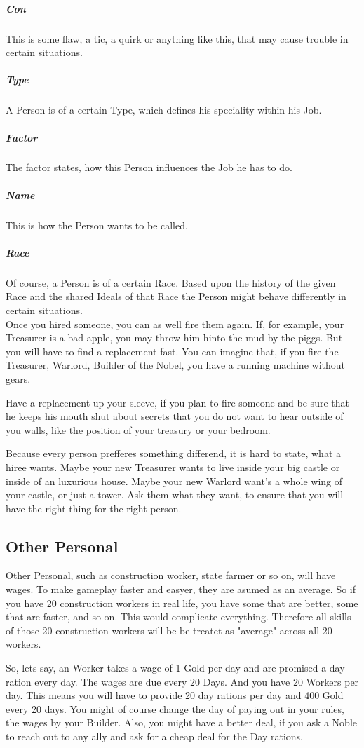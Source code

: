 \documentclass[10pt,twoside,twocolumn,openany]{book}
\begin{document}
\subparagraph{Con} This is some flaw, a tic, a quirk or anything like this, that may cause trouble in certain situations.

\subparagraph{Type} A Person is of a certain Type, which defines his speciality within his Job.

\subparagraph{Factor} The factor states, how this Person influences the Job he has to do.

\subparagraph{Name} This is how the Person wants to be called.

\subparagraph{Race} Of course, a Person is of a certain Race. Based upon the history of the given Race and the shared Ideals of that Race the Person might behave differently in certain situations.\\

Once you hired someone, you can as well fire them again. If, for example, your Treasurer is a bad apple, you may throw him hinto the mud by the piggs. But you will have to find a replacement fast. You can imagine that, if you fire the Treasurer, Warlord, Builder of the Nobel, you have a running machine without gears.

Have a replacement up your sleeve, if you plan to fire someone and be sure that he keeps his mouth shut about secrets that you do not want to hear outside of you walls, like the position of your treasury or your bedroom.

Because every person prefferes something differend, it is hard to state, what a hiree wants. Maybe your new Treasurer wants to live inside your big castle or inside of an luxurious house. Maybe your new Warlord want's a whole wing of your castle, or just a tower. Ask them what they want, to ensure that you will have the right thing for the right person.

\subsection{Other Personal}

Other Personal, such as construction worker, state farmer or so on, will have wages. To make gameplay faster and easyer, they are asumed as an average. So if you have 20 construction workers in real life, you have some that are better, some that are faster, and so on. This would complicate everything. Therefore all skills of those 20 construction workers will be be treatet as "average" across all 20 workers.

So, lets say, an Worker takes a wage of 1 Gold per day and are promised a day ration every day. The wages are due every 20 Days. And you have 20 Workers per day. This means you will have to provide 20 day rations per day and 400 Gold every 20 days. You might of course change the day of paying out in your rules, the wages by your Builder. Also, you might have a better deal, if you ask a Noble to reach out to any ally and ask for a cheap deal for the Day rations.
\end{document}
